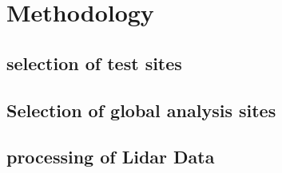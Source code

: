 \chapter{Methodology}
\section{selection of test sites}
\section{Selection of global analysis sites}
\section{processing of Lidar Data}